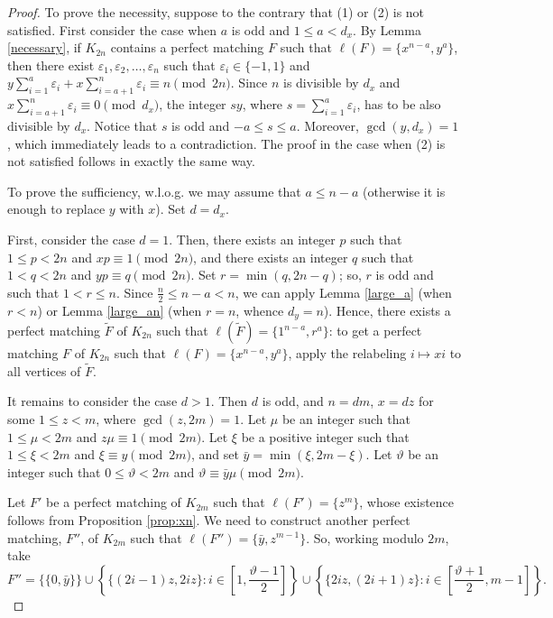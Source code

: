 \documentclass{amsart}
\theoremstyle{definition}
\numberwithin{equation}{section}
\begin{document}
\begin{proof}
To prove the necessity, suppose to the contrary that (1) or (2) is not satisfied. First consider the case when
$a$ is odd and $1\leq a<d_x$.
By Lemma \ref{necessary}, if $K_{2n}$ contains a perfect matching $F$ such that $\ell(F)=
\{ x^{n-a}, y^a\}$, then  there exist $\varepsilon_1,\varepsilon_2,\ldots,\varepsilon_n$ such that
$\varepsilon_i\in \{-1,1\}$ and
$y\sum\limits_{i=1}^{a} \varepsilon_i +x\sum\limits_{i=a+1}^{n} \varepsilon_i \equiv n\pmod {2n}$.
Since $n$ is divisible by $d_x$ and $x\sum\limits_{i=a+1}^{n} \varepsilon_i\equiv 0 \pmod {d_x}$,
the integer $sy$, where $s=\sum\limits_{i=1}^{a} \varepsilon_i$, has to be also divisible by $d_x$.
Notice that $s$ is odd and $-a\leq s\leq a$. Moreover, $\gcd(y,d_x)=1$, which
immediately leads to a contradiction.
The proof in the case when (2) is not satisfied follows in exactly the same way. 

To prove the sufficiency, w.l.o.g. we may assume that $a\leq n-a$ 
(otherwise it is enough to replace $y$ with $x$). Set $d=d_x$.

First, consider the case $d=1$.
Then, there exists an integer $p$ such that $1\leq p<2n$ and $x p\equiv 1\pmod{2n}$,
and there exists an integer $q$ such that $1< q < 2n$ and
$yp\equiv q \pmod{2n}$.
Set $r=\min(q, 2n-q)$; so, $r$ is odd and such that $1<  r \leq n$.
Since $\frac{n}{2}\leq n-a< n$, we can apply Lemma \ref{large_a} (when $r < n$)
or Lemma \ref{large_an} (when $r=n$, whence $d_y=n$).
Hence, there exists a perfect matching $\tilde{F}$ of $K_{2n}$ such that $\ell(\tilde{F})=\{1^{n-a},r^a\}$:
to get a perfect matching $F$ of $K_{2n}$ such that $\ell(F)=\{ x^{n-a}, y^a\}$, 
apply the relabeling $i\mapsto xi$ to all vertices of $\tilde{F}$.


It remains to consider the case $d>1$.
Then $d$ is odd, and $n=dm$, $x=dz$ for some $1\leq z < m$, where $\gcd(z,2m)=1$.
Let $\mu$ be an integer such that $1\leq \mu<2m$ and $z\mu\equiv 1\pmod{2m}$.
Let $\xi$ be a positive integer such that $1\leq \xi <2m$ and $\xi \equiv y \pmod{2m}$,
and set $\bar y =\min(\xi, 2m-\xi)$.
Let $\vartheta$ be an integer such that $0\leq \vartheta < 2m$ and $\vartheta \equiv \bar y \mu\pmod{2m}$.


Let $F'$ be a perfect matching of $K_{2m}$ such that $\ell(F')=\{z^m\}$, whose existence
follows from Proposition \ref{prop:xn}. 
We need to construct another perfect matching,
$F''$, of $K_{2m}$ such that $\ell(F'')=\{\bar y,z^{m-1}\}$.
So, working  modulo $2m$, take
$$F''  = \{\{0,\bar y\}\}\cup \left\{\{(2i-1)z,2iz\}: i\in\left[1,\frac{\vartheta-1}{2}\right]\right\}\cup \left\{\{2iz,(2i+1)z\}: i \in\left[\frac{\vartheta+1}{2},m-1\right]\right\}.$$


\end{proof}
\end{document}
